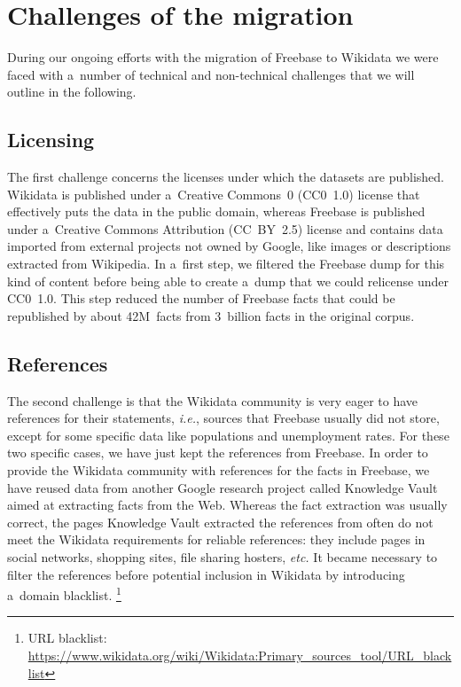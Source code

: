 \documentclass{sig-alternate}
\begin{document}
\section{Challenges of the migration}\label{sec:challenges-of-the-migration}

During our ongoing efforts with the migration of Freebase to Wikidata
we were faced with a~number of technical and non-technical challenges
that we will outline in the following.

\subsection{Licensing}
\label{sec-licensing}

The first challenge concerns the licenses under which the datasets are published.
Wikidata is published under a~Creative Commons~0 (CC0~1.0) license
that effectively puts the data in the public domain,
whereas Freebase is published under a~Creative Commons Attribution (CC~BY~2.5) license
and contains data imported from external projects not owned by Google,
like images or descriptions extracted from Wikipedia.
In a~first step, we filtered the Freebase dump for this kind of content
before being able to create a~dump that we could relicense under CC0~1.0.
This step reduced the number of Freebase facts that could be republished by about 42M~facts
from 3~billion facts in the original corpus.

\subsection{References}

The second challenge is that the Wikidata community is very eager to have references
for their statements, \emph{i.e.}, sources that Freebase usually did not store,
except for some specific data like populations and unemployment rates.
For these two specific cases, we have just kept the references from Freebase.
In order to provide the Wikidata community with references for the facts in Freebase,
we have reused data from another Google research project
called Knowledge Vault~\cite{dong2014knowledge} aimed at extracting facts from the Web.
Whereas the fact extraction was usually correct, the pages Knowledge Vault extracted
the references from often do not meet the Wikidata requirements for reliable references:
they include pages in social networks, shopping sites, file sharing hosters, \emph{etc.}
It became necessary to filter the references before potential inclusion in Wikidata
by introducing a~domain blacklist.%
\footnote{URL blacklist:
\url{https://www.wikidata.org/wiki/Wikidata:Primary_sources_tool/URL_blacklist}}
\end{document}
